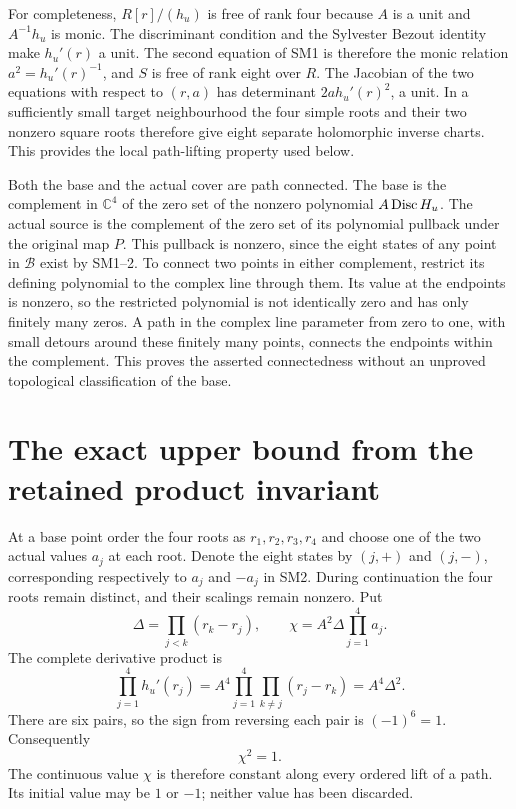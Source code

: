 \documentclass[11pt]{article}
\newcommand{\C}{\mathbb C}
\begin{document}
For completeness, $R[r]/(h_u)$ is free of rank four because $A$
is a unit and $A^{-1}h_u$ is monic. The discriminant condition
and the Sylvester Bezout identity make $h_u'(r)$ a unit. The
second equation of SM1 is therefore the monic relation
$a^2=h_u'(r)^{-1}$, and $S$ is free of rank eight over $R$.
The Jacobian of the two equations with respect to $(r,a)$ has
determinant $2a h_u'(r)^2$, a unit. In a sufficiently small target
neighbourhood the four simple roots and their two nonzero square
roots therefore give eight separate holomorphic inverse charts.
This provides the local path-lifting property used below.

Both the base and the actual cover are path connected. The base
is the complement in $\C^4$ of the zero set of the nonzero
polynomial $A\operatorname{Disc} H_u$. The actual source is the complement
of the zero set of its polynomial pullback under the original map
$P$. This pullback is nonzero, since the eight states of any point
in $\mathcal B$ exist by SM1--2. To connect two points in either
complement, restrict its defining polynomial to the complex line
through them. Its value at the endpoints is nonzero, so the
restricted polynomial is not identically zero and has only
finitely many zeros. A path in the complex line parameter from
zero to one, with small detours around these finitely many points,
connects the endpoints within the complement. This proves the
asserted connectedness without an unproved topological
classification of the base.

\section{The exact upper bound from the retained product invariant}
At a base point order the four roots as $r_1,r_2,r_3,r_4$ and
choose one of the two actual values $a_j$ at each root. Denote
the eight states by $(j,+)$ and $(j,-)$, corresponding respectively
to $a_j$ and $-a_j$ in SM2. During continuation the four roots
remain distinct, and their scalings remain nonzero. Put
\[
 \Delta=\prod_{j<k}(r_k-r_j),\qquad
 \chi=A^2\Delta\prod_{j=1}^4a_j.
\]
The complete derivative product is
\[
 \prod_{j=1}^4h_u'(r_j)
 =A^4\prod_{j=1}^4\prod_{k\ne j}(r_j-r_k)
 =A^4\Delta^2.
\]
There are six pairs, so the sign from reversing each pair is
$(-1)^6=1$. Consequently
\begin{equation}
 \chi^2=1.\tag{SM3}
\end{equation}
The continuous value $\chi$ is therefore constant along every
ordered lift of a path. Its initial value may be $1$ or $-1$;
neither value has been discarded.
\end{document}
